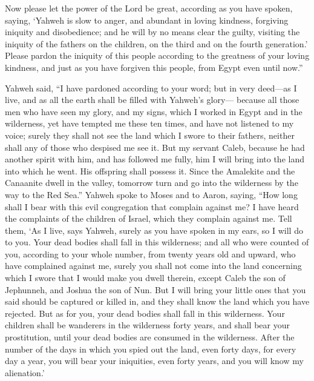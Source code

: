 {Now please let the power of the Lord be great, according as you have spoken, saying,
‘Yahweh is slow to anger, and abundant in loving kindness, forgiving iniquity and disobedience; and he will by no means clear the guilty, visiting the iniquity of the fathers on the children, on the third and on the fourth generation.’
Please pardon the iniquity of this people according to the greatness of your loving kindness, and just as you have forgiven this people, from Egypt even until now.”
\par }{\PP {}Yahweh said, “I have pardoned according to your word;
but in very deed—as I live, and as all the earth shall be filled with Yahweh’s glory—
because all those men who have seen my glory, and my signs, which I worked in Egypt and in the wilderness, yet have tempted me these ten times, and have not listened to my voice;
surely they shall not see the land which I swore to their fathers, neither shall any of those who despised me see it.
But my servant Caleb, because he had another spirit with him, and has followed me fully, him I will bring into the land into which he went. His offspring shall possess it.
Since the Amalekite and the Canaanite dwell in the valley, tomorrow turn and go into the wilderness by the way to the Red Sea.”
Yahweh spoke to Moses and to Aaron, saying,
“How long shall I bear with this evil congregation that complain against me? I have heard the complaints of the children of Israel, which they complain against me.
Tell them, ‘As I live, says Yahweh, surely as you have spoken in my ears, so I will do to you.
Your dead bodies shall fall in this wilderness; and all who were counted of you, according to your whole number, from twenty years old and upward, who have complained against me,
surely you shall not come into the land concerning which I swore that I would make you dwell therein, except Caleb the son of Jephunneh, and Joshua the son of Nun.
But I will bring your little ones that you said should be captured or killed in, and they shall know the land which you have rejected.
But as for you, your dead bodies shall fall in this wilderness.
Your children shall be wanderers in the wilderness forty years, and shall bear your prostitution, until your dead bodies are consumed in the wilderness.
After the number of the days in which you spied out the land, even forty days, for every day a year, you will bear your iniquities, even forty years, and you will know my alienation.’
}
